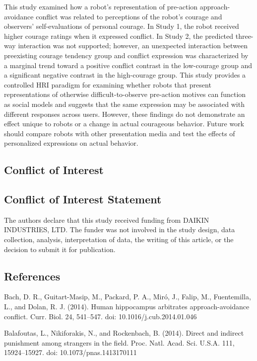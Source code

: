 \documentclass[
]{article}
\begin{document}
This study examined how a robot's representation of pre-action
approach-avoidance conflict was related to perceptions of the robot's
courage and observers' self-evaluations of personal courage. In Study 1,
the robot received higher courage ratings when it expressed conflict. In
Study 2, the predicted three-way interaction was not supported; however,
an unexpected interaction between preexisting courage tendency group and
conflict expression was characterized by a marginal trend toward a
positive conflict contrast in the low-courage group and a significant
negative contrast in the high-courage group. This study provides a
controlled HRI paradigm for examining whether robots that present
representations of otherwise difficult-to-observe pre-action motives can
function as social models and suggests that the same expression may be
associated with different responses across users. However, these
findings do not demonstrate an effect unique to robots or a change in
actual courageous behavior. Future work should compare robots with other
presentation media and test the effects of personalized expressions on
actual behavior.

\subsection{Conflict of Interest}\label{conflict-of-interest}

\subsection{Conflict of Interest
Statement}\label{conflict-of-interest-statement}

The authors declare that this study received funding from DAIKIN
INDUSTRIES, LTD. The funder was not involved in the study design, data
collection, analysis, interpretation of data, the writing of this
article, or the decision to submit it for publication.

\subsection{References}\label{references}

Bach, D. R., Guitart-Masip, M., Packard, P. A., Miró, J., Falip, M.,
Fuentemilla, L., and Dolan, R. J. (2014). Human hippocampus arbitrates
approach-avoidance conflict. Curr. Biol. 24, 541--547. doi:
10.1016/j.cub.2014.01.046

Balafoutas, L., Nikiforakis, N., and Rockenbach, B. (2014). Direct and
indirect punishment among strangers in the field. Proc. Natl. Acad. Sci.
U.S.A. 111, 15924--15927. doi: 10.1073/pnas.1413170111
\end{document}
